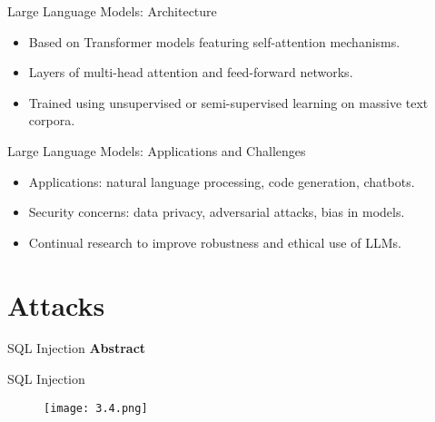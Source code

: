 \documentclass[t,ignorenonframetext]{beamer}
\begin{document}
\begin{frame}{Large Language Models: Architecture}
\begin{itemize}
\item Based on Transformer models featuring self-attention mechanisms.
\item Layers of multi-head attention and feed-forward networks.
\item Trained using unsupervised or semi-supervised learning on massive text corpora.
\end{itemize}
\end{frame}

\begin{frame}{Large Language Models: Applications and Challenges}
\begin{itemize}
\item Applications: natural language processing, code generation, chatbots.
\item Security concerns: data privacy, adversarial attacks, bias in models.
\item Continual research to improve robustness and ethical use of LLMs.
\end{itemize}
\end{frame}

\section{Attacks}
\begin{frame}{SQL Injection}
\textbf{Abstract}

\end{frame}

\begin{frame}{SQL Injection}
\begin{figure}[htb]
	\centering
	\texttt{[image: 3.4.png]}
\end{figure}

\end{frame}
\end{document}
